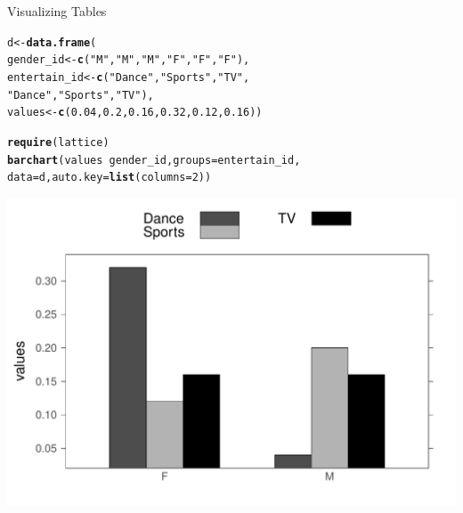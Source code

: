 \documentclass{beamer}\usepackage[]{graphicx}\usepackage[]{color}
\makeatletter
\newcommand{\hlnum}[1]{\textcolor[rgb]{0.2,0.2,0.2}{#1}}%
\newcommand{\hlstr}[1]{\textcolor[rgb]{0.2,0.2,0.2}{#1}}%
\newcommand{\hlopt}[1]{\textcolor[rgb]{0.102,0.102,0.102}{#1}}%
\newcommand{\hlstd}[1]{\textcolor[rgb]{0.102,0.102,0.102}{#1}}%
\newcommand{\hlkwb}[1]{\textcolor[rgb]{0.102,0.102,0.102}{#1}}%
\newcommand{\hlkwc}[1]{\textcolor[rgb]{0.2,0.2,0.2}{#1}}%
\newcommand{\hlkwd}[1]{\textcolor[rgb]{0.102,0.102,0.102}{\textbf{#1}}}%
\newenvironment{kframe}{%
 \def\at@end@of@kframe{}%
 \ifinner\ifhmode%
  \def\at@end@of@kframe{\end{minipage}}%
  \begin{minipage}{\columnwidth}%
 \fi\fi%
 \def\FrameCommand##1{\hskip\@totalleftmargin \hskip-\fboxsep
 \colorbox{shadecolor}{##1}\hskip-\fboxsep
     \hskip-\linewidth \hskip-\@totalleftmargin \hskip\columnwidth}%
 \MakeFramed {\advance\hsize-\width
   \@totalleftmargin\z@ \linewidth\hsize
   \@setminipage}}%
 {\par\unskip\endMakeFramed%
 \at@end@of@kframe}
\newenvironment{knitrout}{}{} %
\renewenvironment{knitrout}{\begin{spacing}{0.75}\begin{tiny}}{\end{tiny}\end{spacing}}
\makeatother
\begin{document}
\begin{frame}{Visualizing Tables}

\begin{knitrout}\small
{}\color{fgcolor}\begin{kframe}
\begin{alltt}
\hlstd{d} \hlkwb{<-} \hlkwd{data.frame}\hlstd{(}
      \hlstd{gender_id}\hlkwb{<-} \hlkwd{c}\hlstd{(}\hlstr{"M"}\hlstd{,}\hlstr{"M"}\hlstd{,}\hlstr{"M"}\hlstd{,}\hlstr{"F"}\hlstd{,}\hlstr{"F"}\hlstd{,}\hlstr{"F"}\hlstd{),}
      \hlstd{entertain_id} \hlkwb{<-} \hlkwd{c}\hlstd{(}\hlstr{"Dance"}\hlstd{,} \hlstr{"Sports"}\hlstd{,} \hlstr{"TV"}\hlstd{,}
                        \hlstr{"Dance"}\hlstd{,} \hlstr{"Sports"}\hlstd{,} \hlstr{"TV"}\hlstd{),}
      \hlstd{values} \hlkwb{<-} \hlkwd{c}\hlstd{(}\hlnum{0.04}\hlstd{,} \hlnum{0.2}\hlstd{,} \hlnum{0.16}\hlstd{,} \hlnum{0.32}\hlstd{,} \hlnum{0.12}\hlstd{,} \hlnum{0.16}\hlstd{))}

\hlkwd{require}\hlstd{(lattice)}
\hlkwd{barchart}\hlstd{(values} \hlopt{~} \hlstd{gender_id,} \hlkwc{groups}\hlstd{=entertain_id,}
         \hlkwc{data}\hlstd{=d,} \hlkwc{auto.key} \hlstd{=} \hlkwd{list}\hlstd{(}\hlkwc{columns} \hlstd{=} \hlnum{2}\hlstd{))}
\end{alltt}
\end{kframe}

{\centering \includegraphics[width=0.99\linewidth]{figure/graphics-unnamed-chunk-1-1} 

}




\end{knitrout}
\end{frame}
\end{document}
